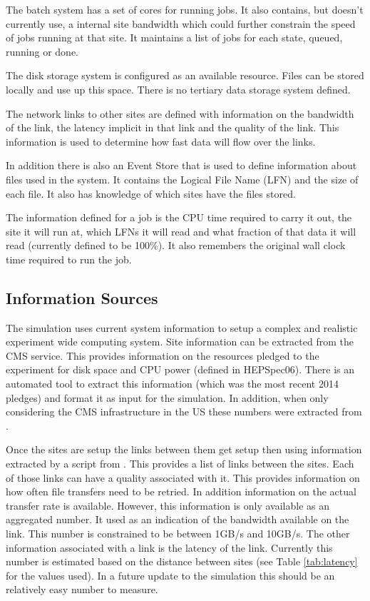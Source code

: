 \documentclass[a4paper]{jpconf}
\begin{document}
The batch system has a set of cores for running jobs. It also
contains, but doesn't currently use, a internal site bandwidth which
could further constrain the speed of jobs running at that site. It
maintains a list of jobs for each state, queued, running or done.

The disk storage system is configured as an available resource. Files
can be stored locally and use up this space. There is no tertiary data
storage system defined.

The network links to other sites are defined with information on the
bandwidth of the link, the latency implicit in that link and the quality
of the link. This information is used to determine how fast data will
flow over the links.

In addition there is also an Event Store that is used to define
information about files used in the system. It contains the Logical
File Name (LFN) and the size of each file. It also has knowledge of
which sites have the files stored.

The information defined for a job is the CPU time required to carry it
out, the site it will run at, which LFNs it will read and what
fraction of that data it will read (currently defined to be 100\%). It
also remembers the original wall clock time required to run the job.

\subsection{Information Sources}

The simulation uses current system information to setup a complex and
realistic experiment wide computing system. Site information can be
extracted from the CMS
service. This provides information on the resources pledged to the
experiment for disk space and CPU power (defined in HEPSpec06). There
is an automated tool to extract this information (which was the most
recent 2014 pledges) and format it as input for the simulation. In
addition, when only considering the CMS infrastructure in the US these
numbers were extracted from
.

Once the sites are setup the links between them get setup then using
information extracted by a script from
. This
provides a list of links between the sites. Each of those links can
have a quality associated with it. This provides information on how
often file transfers need to be retried. In addition information on
the actual transfer rate is available. However, this information is
only available as an aggregated number. It used as an indication of
the bandwidth available on the link. This number is constrained to be
between 1GB/s and 10GB/s. The other information associated with a link
is the latency of the link. Currently this number is estimated based
on the distance between sites (see Table \ref{tab:latency} for the
values used). In a future update to the simulation this should be an
relatively easy number to measure.
\end{document}
